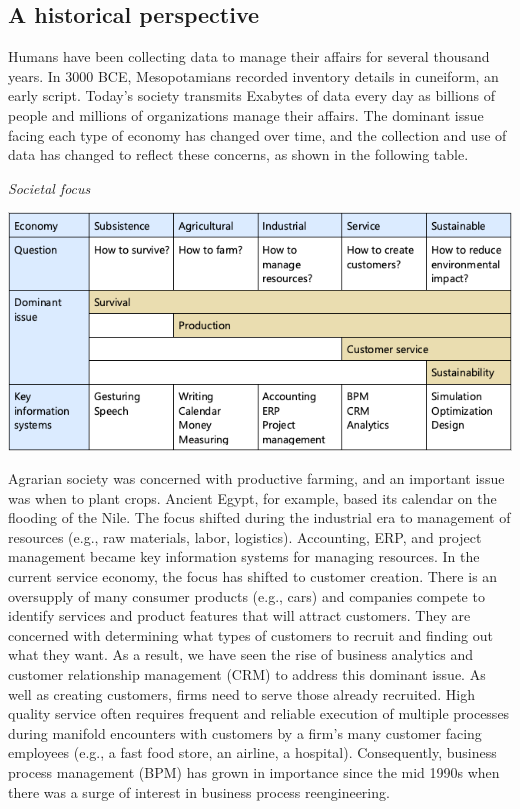 \documentclass[
]{article}
\begin{document}
\hypertarget{a-historical-perspective}{%
\subsection*{A historical perspective}\label{a-historical-perspective}}

Humans have been collecting data to manage their affairs for several
thousand years. In 3000 BCE, Mesopotamians recorded inventory details in
cuneiform, an early script. Today's society transmits Exabytes of data
every day as billions of people and millions of organizations manage
their affairs. The dominant issue facing each type of economy has
changed over time, and the collection and use of data has changed to
reflect these concerns, as shown in the following table.

\emph{Societal focus}

\includegraphics{Figures/Chapter 2/societal focus.png}

Agrarian society was concerned with productive farming, and an important
issue was when to plant crops. Ancient Egypt, for example, based its
calendar on the flooding of the Nile. The focus shifted during the
industrial era to management of resources (e.g., raw materials, labor,
logistics). Accounting, ERP, and project management became key
information systems for managing resources. In the current service
economy, the focus has shifted to customer creation. There is an
oversupply of many consumer products (e.g., cars) and companies compete
to identify services and product features that will attract customers.
They are concerned with determining what types of customers to recruit
and finding out what they want. As a result, we have seen the rise of
business analytics and customer relationship management (CRM) to address
this dominant issue. As well as creating customers, firms need to serve
those already recruited. High quality service often requires frequent
and reliable execution of multiple processes during manifold encounters
with customers by a firm's many customer facing employees (e.g., a fast
food store, an airline, a hospital). Consequently, business process
management (BPM) has grown in importance since the mid 1990s when there
was a surge of interest in business process reengineering.
\end{document}
